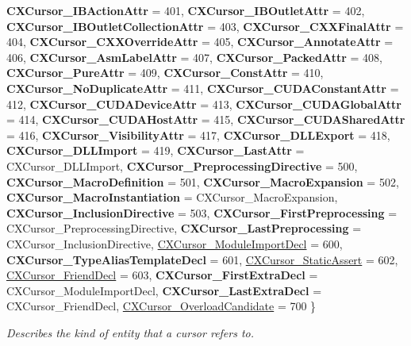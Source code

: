 \begin{DoxyCompactItemize}
{\bfseries C\+X\+Cursor\+\_\+\+I\+B\+Action\+Attr} = 401, 
{\bfseries C\+X\+Cursor\+\_\+\+I\+B\+Outlet\+Attr} = 402, 
{\bfseries C\+X\+Cursor\+\_\+\+I\+B\+Outlet\+Collection\+Attr} = 403, 
\newline
{\bfseries C\+X\+Cursor\+\_\+\+C\+X\+X\+Final\+Attr} = 404, 
{\bfseries C\+X\+Cursor\+\_\+\+C\+X\+X\+Override\+Attr} = 405, 
{\bfseries C\+X\+Cursor\+\_\+\+Annotate\+Attr} = 406, 
{\bfseries C\+X\+Cursor\+\_\+\+Asm\+Label\+Attr} = 407, 
\newline
{\bfseries C\+X\+Cursor\+\_\+\+Packed\+Attr} = 408, 
{\bfseries C\+X\+Cursor\+\_\+\+Pure\+Attr} = 409, 
{\bfseries C\+X\+Cursor\+\_\+\+Const\+Attr} = 410, 
{\bfseries C\+X\+Cursor\+\_\+\+No\+Duplicate\+Attr} = 411, 
\newline
{\bfseries C\+X\+Cursor\+\_\+\+C\+U\+D\+A\+Constant\+Attr} = 412, 
{\bfseries C\+X\+Cursor\+\_\+\+C\+U\+D\+A\+Device\+Attr} = 413, 
{\bfseries C\+X\+Cursor\+\_\+\+C\+U\+D\+A\+Global\+Attr} = 414, 
{\bfseries C\+X\+Cursor\+\_\+\+C\+U\+D\+A\+Host\+Attr} = 415, 
\newline
{\bfseries C\+X\+Cursor\+\_\+\+C\+U\+D\+A\+Shared\+Attr} = 416, 
{\bfseries C\+X\+Cursor\+\_\+\+Visibility\+Attr} = 417, 
{\bfseries C\+X\+Cursor\+\_\+\+D\+L\+L\+Export} = 418, 
{\bfseries C\+X\+Cursor\+\_\+\+D\+L\+L\+Import} = 419, 
\newline
{\bfseries C\+X\+Cursor\+\_\+\+Last\+Attr} = C\+X\+Cursor\+\_\+\+D\+L\+L\+Import, 
{\bfseries C\+X\+Cursor\+\_\+\+Preprocessing\+Directive} = 500, 
{\bfseries C\+X\+Cursor\+\_\+\+Macro\+Definition} = 501, 
{\bfseries C\+X\+Cursor\+\_\+\+Macro\+Expansion} = 502, 
\newline
{\bfseries C\+X\+Cursor\+\_\+\+Macro\+Instantiation} = C\+X\+Cursor\+\_\+\+Macro\+Expansion, 
{\bfseries C\+X\+Cursor\+\_\+\+Inclusion\+Directive} = 503, 
{\bfseries C\+X\+Cursor\+\_\+\+First\+Preprocessing} = C\+X\+Cursor\+\_\+\+Preprocessing\+Directive, 
{\bfseries C\+X\+Cursor\+\_\+\+Last\+Preprocessing} = C\+X\+Cursor\+\_\+\+Inclusion\+Directive, 
\newline
\hyperlink{group__CINDEX_ggaaccc432245b4cd9f2d470913f9ef0013acf846838dc1c12e560c9dbf43fa97928}{C\+X\+Cursor\+\_\+\+Module\+Import\+Decl} = 600, 
{\bfseries C\+X\+Cursor\+\_\+\+Type\+Alias\+Template\+Decl} = 601, 
\hyperlink{group__CINDEX_ggaaccc432245b4cd9f2d470913f9ef0013acf4aa9fce47b10d5d3ff015c671dda45}{C\+X\+Cursor\+\_\+\+Static\+Assert} = 602, 
\hyperlink{group__CINDEX_ggaaccc432245b4cd9f2d470913f9ef0013ae0a01a4768fab70eadb25c755d5d36a6}{C\+X\+Cursor\+\_\+\+Friend\+Decl} = 603, 
\newline
{\bfseries C\+X\+Cursor\+\_\+\+First\+Extra\+Decl} = C\+X\+Cursor\+\_\+\+Module\+Import\+Decl, 
{\bfseries C\+X\+Cursor\+\_\+\+Last\+Extra\+Decl} = C\+X\+Cursor\+\_\+\+Friend\+Decl, 
\hyperlink{group__CINDEX_ggaaccc432245b4cd9f2d470913f9ef0013adf315bb7bfe68757ae933a8b95b40357}{C\+X\+Cursor\+\_\+\+Overload\+Candidate} = 700
 \}\begin{DoxyCompactList}\small\item\em Describes the kind of entity that a cursor refers to. \end{DoxyCompactList}
\end{DoxyCompactItemize}
